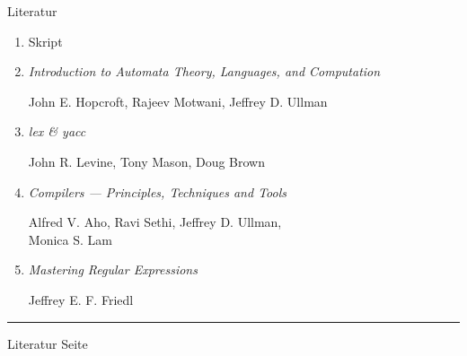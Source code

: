 \documentclass{slides}
\newcounter{mypage}
\begin{document}
\begin{slide}{}
\normalsize
\begin{center}
Literatur
\end{center}
\vspace{0.5cm}

\footnotesize
\begin{enumerate}
\item Skript
\item \emph{Introduction to Automata Theory, Languages, and Computation}

      John E. Hopcroft, Rajeev Motwani, Jeffrey D. Ullman
\item \emph{lex \& yacc} 

      John R. Levine, Tony Mason, Doug Brown
\item \emph{Compilers --- Principles, Techniques and Tools}

      Alfred V. Aho, Ravi Sethi, Jeffrey D. Ullman, \\
      Monica S. Lam
\item \emph{Mastering Regular Expressions}

      Jeffrey E. F. Friedl
\end{enumerate}

\vspace*{\fill}
\tiny \addtocounter{mypage}{1}
\rule{17cm}{1mm}
Literatur  \hspace*{\fill} Seite 
\end{slide}



\end{document}

